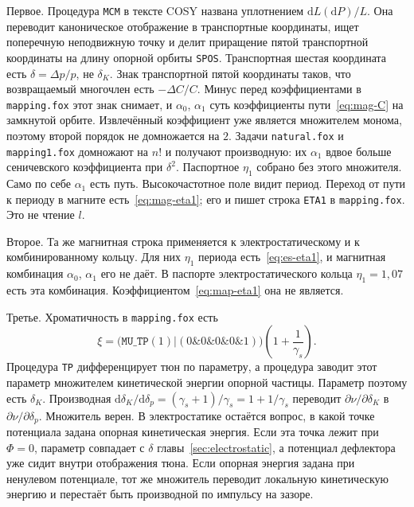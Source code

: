 \documentclass[aps,pra,preprint,a4paper,amsmath,amssymb,longbibliography]{revtex4-2}
\begin{document}
Первое. Процедура \texttt{MCM} в тексте COSY названа уплотнением $\mathrm{d}L(\mathrm{d}P)/L$. Она переводит каноническое отображение в транспортные координаты, ищет поперечную неподвижную точку и делит приращение пятой транспортной координаты на длину опорной орбиты \texttt{SPOS}. Транспортная шестая координата есть $\delta=\Delta p/p$, не $\delta_K$. Знак транспортной пятой координаты таков, что возвращаемый многочлен есть $-\Delta C/C$. Минус перед коэффициентами в \texttt{mapping.fox} этот знак снимает, и $\alpha_0$, $\alpha_1$ суть коэффициенты пути~\eqref{eq:mag-C} на замкнутой орбите. Извлечённый коэффициент уже является множителем монома, поэтому второй порядок не домножается на $2$. Задачи \texttt{natural.fox} и \texttt{mapping1.fox} домножают на $n!$ и получают производную: их $\alpha_1$ вдвое больше сеничевского коэффициента при $\delta^2$. Паспортное $\eta_1$ собрано без этого множителя. Само по себе $\alpha_1$ есть путь. Высокочастотное поле видит период. Переход от пути к периоду в магните есть~\eqref{eq:mag-eta1}; его и пишет строка \texttt{ETA1} в \texttt{mapping.fox}. Это не чтение $l$.

Второе. Та же магнитная строка применяется к электростатическому и к комбинированному кольцу. Для них $\eta_1$ периода есть~\eqref{eq:es-eta1}, и магнитная комбинация $\alpha_0$, $\alpha_1$ его не даёт. В паспорте электростатического кольца $\eta_1=1{,}07$ есть эта комбинация. Коэффициентом~\eqref{eq:map-eta1} она не является.

Третье. Хроматичность в \texttt{mapping.fox} есть
\begin{equation}
\label{eq:map-chrom}
\xi
=
\bigl(\texttt{MU\_TP}(1)|(0\&0\&0\&0\&1)\bigr)
\left(1+\frac{1}{\gamma_s}\right).
\end{equation}
Процедура \texttt{TP} дифференцирует тюн по параметру, а процедура  заводит этот параметр множителем кинетической энергии опорной частицы. Параметр поэтому есть $\delta_K$. Производная $\mathrm{d}\delta_K/\mathrm{d}\delta_p=(\gamma_s+1)/\gamma_s=1+1/\gamma_s$ переводит $\partial\nu/\partial\delta_K$ в $\partial\nu/\partial\delta_p$. Множитель верен. В электростатике остаётся вопрос, в какой точке потенциала задана опорная кинетическая энергия. Если эта точка лежит при $\Phi=0$, параметр совпадает с $\delta$ главы~\ref{sec:electrostatic}, а потенциал дефлектора уже сидит внутри отображения тюна. Если опорная энергия задана при ненулевом потенциале, тот же множитель переводит локальную кинетическую энергию и перестаёт быть производной по импульсу на зазоре.
\end{document}
